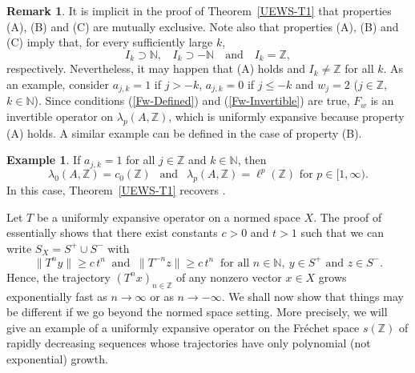 \documentclass[12pt]{amsart}
\theoremstyle{theorem}
\theoremstyle{definition}
\newtheorem{example}[theorem]{Example}
\newtheorem{remark}[theorem]{Remark}
\theoremstyle{remark} \theoremstyle{question} \theoremstyle{example}
\newcommand{\N}{\mathbb{N}}   %
\newcommand{\Z}{\mathbb{Z}}   %
\begin{document}
\begin{remark}\label{UEWS-R1}
It is implicit in the proof of Theorem~\ref{UEWS-T1} that properties (A), (B) and (C) are mutually exclusive.
Note also that properties (A), (B) and (C) imply that, for every sufficiently large $k$,
\[
I_k \supset \N, \ \ \ \ I_k \supset -\N \ \ \ \text{ and } \ \ \ I_k = \Z,
\]
respectively. Nevertheless, it may happen that (A) holds and $I_k \neq \Z$ for all $k$.
As an example, consider $a_{j,k} = 1$ if $j > -k$, $a_{j,k} = 0$ if $j \leq -k$ and $w_j = 2$ ($j \in \Z$, $k \in \N$).
Since conditions (\ref{Fw-Defined}) and (\ref{Fw-Invertible}) are true, $F_w$ is an invertible operator on $\lambda_p(A,\Z)$,
which is uniformly expansive because property (A) holds.
A similar example can be defined in the case of property (B).
\end{remark}

\begin{example}\label{UEWS-E1}
If $a_{j,k} = 1$ for all $j \in \Z$ and $k \in \N$, then
\[
\lambda_0(A,\Z) = c_0(\Z) \ \ \text{ and } \ \ \lambda_p(A,\Z) = \ell^p(\Z) \text{ for } p \in [1,\infty).
\]
In this case, Theorem~\ref{UEWS-T1} recovers \cite[Theorem~E(2)]{BerCirDarMesPuj18}.
\end{example}

Let $T$ be a uniformly expansive operator on a normed space $X$. The proof of \cite[Proposition~19(d)]{BerCirDarMesPuj18} 
essentially shows that there exist constants $c > 0$ and $t > 1$ such that we can write $S_X = S^+ \cup S^-$ with
\[
\|T^n y\| \geq c\, t^n \ \text{ and } \ \|T^{-n} z\| \geq c\, t^n \ \text{ for all } n \in \N, \ y \in S^+ \text{ and } z \in S^-.
\]
Hence, the trajectory $(T^n x)_{n \in \Z}$ of any nonzero vector $x \in X$ grows exponentially fast as $n \to \infty$ or as $n \to -\infty$.
We shall now show that things may be different if we go beyond the normed space setting.
More precisely, we will give an example of a uniformly expansive operator on the Fr\'echet space $s(\Z)$ of rapidly decreasing sequences 
whose trajectories have only polynomial (not exponential) growth.
\end{document}
